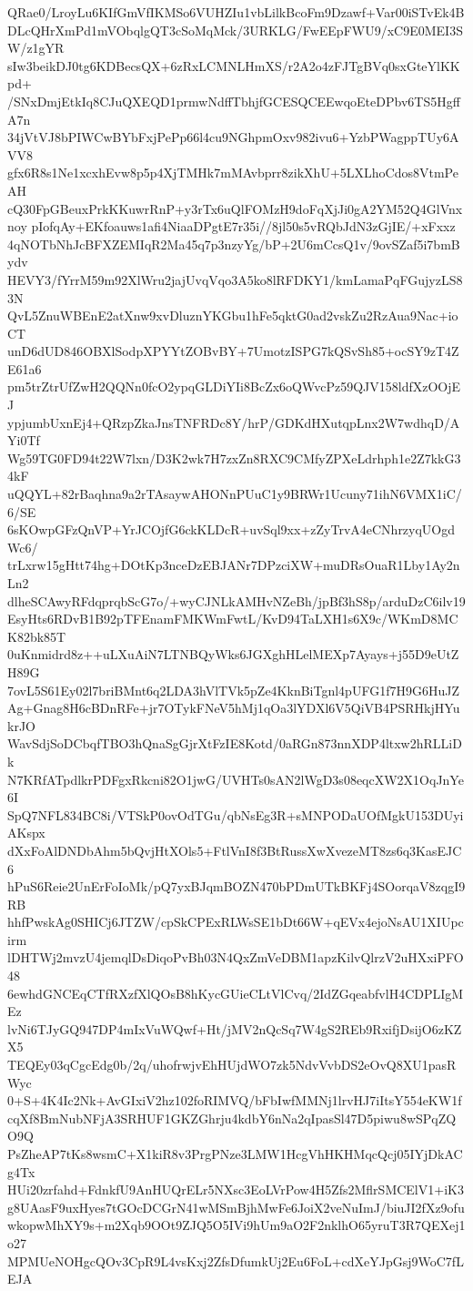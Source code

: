 QRae0/LroyLu6KIfGmVfIKMSo6VUHZIu1vbLilkBcoFm9Dzawf+Var00iSTvEk4B
DLcQHrXmPd1mVObqlgQT3cSoMqMck/3URKLG/FwEEpFWU9/xC9E0MEI3SW/z1gYR
sIw3beikDJ0tg6KDBecsQX+6zRxLCMNLHmXS/r2A2o4zFJTgBVq0sxGteYlKKpd+
/SNxDmjEtkIq8CJuQXEQD1prmwNdffTbhjfGCESQCEEwqoEteDPbv6TS5HgffA7n
34jVtVJ8bPIWCwBYbFxjPePp66l4cu9NGhpmOxv982ivu6+YzbPWagppTUy6AVV8
gfx6R8s1Ne1xcxhEvw8p5p4XjTMHk7mMAvbprr8zikXhU+5LXLhoCdos8VtmPeAH
cQ30FpGBeuxPrkKKuwrRnP+y3rTx6uQlFOMzH9doFqXjJi0gA2YM52Q4GlVnxnoy
pIofqAy+EKfoauws1afi4NiaaDPgtE7r35i//8jl50s5vRQbJdN3zGjIE/+xFxxz
4qNOTbNhJcBFXZEMIqR2Ma45q7p3nzyYg/bP+2U6mCcsQ1v/9ovSZaf5i7bmBydv
HEVY3/fYrrM59m92XlWru2jajUvqVqo3A5ko8lRFDKY1/kmLamaPqFGujyzLS83N
QvL5ZnuWBEnE2atXnw9xvDluznYKGbu1hFe5qktG0ad2vskZu2RzAua9Nac+ioCT
unD6dUD846OBXlSodpXPYYtZOBvBY+7UmotzISPG7kQSvSh85+ocSY9zT4ZE61a6
pm5trZtrUfZwH2QQNn0fcO2ypqGLDiYIi8BcZx6oQWvcPz59QJV158ldfXzOOjEJ
ypjumbUxnEj4+QRzpZkaJnsTNFRDc8Y/hrP/GDKdHXutqpLnx2W7wdhqD/AYi0Tf
Wg59TG0FD94t22W7lxn/D3K2wk7H7zxZn8RXC9CMfyZPXeLdrhph1e2Z7kkG34kF
uQQYL+82rBaqhna9a2rTAsaywAHONnPUuC1y9BRWr1Ucuny71ihN6VMX1iC/6/SE
6sKOwpGFzQnVP+YrJCOjfG6ckKLDcR+uvSql9xx+zZyTrvA4eCNhrzyqUOgdWc6/
trLxrw15gHtt74hg+DOtKp3nceDzEBJANr7DPzciXW+muDRsOuaR1Lby1Ay2nLn2
dlheSCAwyRFdqprqbScG7o/+wyCJNLkAMHvNZeBh/jpBf3hS8p/arduDzC6ilv19
EsyHts6RDvB1B92pTFEnamFMKWmFwtL/KvD94TaLXH1s6X9c/WKmD8MCK82bk85T
0uKnmidrd8z++uLXuAiN7LTNBQyWks6JGXghHLelMEXp7Ayays+j55D9eUtZH89G
7ovL5S61Ey02l7briBMnt6q2LDA3hVlTVk5pZe4KknBiTgnl4pUFG1f7H9G6HuJZ
Ag+Gnag8H6cBDnRFe+jr7OTykFNeV5hMj1qOa3lYDXl6V5QiVB4PSRHkjHYukrJO
WavSdjSoDCbqfTBO3hQnaSgGjrXtFzIE8Kotd/0aRGn873nnXDP4ltxw2hRLLiDk
N7KRfATpdlkrPDFgxRkcni82O1jwG/UVHTs0sAN2lWgD3s08eqcXW2X1OqJnYe6I
SpQ7NFL834BC8i/VTSkP0ovOdTGu/qbNsEg3R+sMNPODaUOfMgkU153DUyiAKspx
dXxFoAlDNDbAhm5bQvjHtXOls5+FtlVnI8f3BtRussXwXvezeMT8zs6q3KasEJC6
hPuS6Reie2UnErFoIoMk/pQ7yxBJqmBOZN470bPDmUTkBKFj4SOorqaV8zqgI9RB
hhfPwskAg0SHICj6JTZW/cpSkCPExRLWsSE1bDt66W+qEVx4ejoNsAU1XIUpcirm
lDHTWj2mvzU4jemqlDsDiqoPvBh03N4QxZmVeDBM1apzKilvQlrzV2uHXxiPFO48
6ewhdGNCEqCTfRXzfXlQOsB8hKycGUieCLtVlCvq/2IdZGqeabfvlH4CDPLIgMEz
lvNi6TJyGQ947DP4mIxVuWQwf+Ht/jMV2nQcSq7W4gS2REb9RxifjDsijO6zKZX5
TEQEy03qCgcEdg0b/2q/uhofrwjvEhHUjdWO7zk5NdvVvbDS2eOvQ8XU1pasRWyc
0+S+4K4Ic2Nk+AvGIxiV2hz102foRIMVQ/bFbIwfMMNj1lrvHJ7iItsY554eKW1f
cqXf8BmNubNFjA3SRHUF1GKZGhrju4kdbY6nNa2qIpasSl47D5piwu8wSPqZQO9Q
PsZheAP7tKs8wsmC+X1kiR8v3PrgPNze3LMW1HcgVhHKHMqcQcj05IYjDkACg4Tx
HUi20zrfahd+FdnkfU9AnHUQrELr5NXsc3EoLVrPow4H5Zfs2MflrSMCElV1+iK3
g8UAasF9uxHyes7tGOcDCGrN41wMSmBjhMwFe6JoiX2veNuImJ/biuJI2fXz9ofu
wkopwMhXY9s+m2Xqb9OOt9ZJQ5O5IVi9hUm9aO2F2nklhO65yruT3R7QEXej1o27
MPMUeNOHgcQOv3CpR9L4vsKxj2ZfsDfumkUj2Eu6FoL+cdXeYJpGsj9WoC7fLEJA
